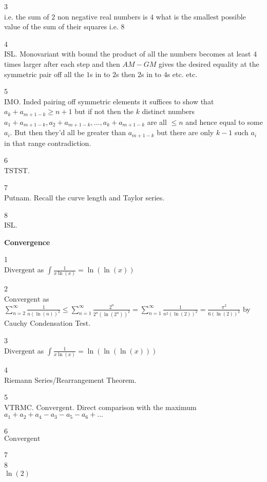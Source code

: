 3 \\
i.e. the sum of $2$ non negative real numbers is $4$ what is the smallest possible value of the sum of their squares i.e. $\boxed{8}$

4 \\
ISL. Monovariant with bound the product of all the numbers becomes at least $4$ times larger after each step and then $AM-GM$ gives the desired equality at the symmetric pair off all the $1$s in to $2$s then $2$s in to $4$s etc. etc.

5 \\
IMO. Inded pairing off symmetric elements it suffices to show that $a_k+a_{m+1-k} \ge n+1$ but if not then the $k$ distinct numbers $a_1+a_{m+1-k},a_2+a_{m+1-k},\dots,a_k+a_{m+1-k}$ are all $\le n$ and hence equal to some $a_i$. But then they'd all be greater than $a_{m+1-k}$ but there are only $k-1$ such $a_i$ in that range contradiction.

6 \\
TSTST.

7 \\
Putnam. Recall the curve length and Taylor series.

8 \\
ISL.

\newpage

\textbf{Convergence}

1 \\
$\boxed{\text{Divergent}}$ as $\int \frac{1}{x\ln(x)}=\ln(\ln(x))$

2 \\
$\boxed{\text{Convergent}}$ as $\sum_{n=2}^{\infty}\frac{1}{n(\ln(n))^2}\le\sum_{n=1}^{\infty}\frac{2^n}{2^n(\ln(2^n))^2}=\sum_{n=1}^{\infty}\frac{1}{n^2(\ln(2))^2}=\frac{\pi^2}{6(\ln(2))^2}$ by Cauchy Condensation Test.

3 \\
$\boxed{\text{Divergent}}$ as $\int \frac{1}{x\ln(x)}=\ln(\ln(\ln(x)))$

4 \\
Riemann Series/Rearrangement Theorem.

5 \\
VTRMC. $\boxed{\text{Convergent}}$. Direct comparison with the maximum $a_1+a_2+a_4-a_3-a_5-a_6+\dots$

6 \\
$\boxed{\text{Convergent}}$

7 \\


8 \\
$\boxed{\ln(2)}$

